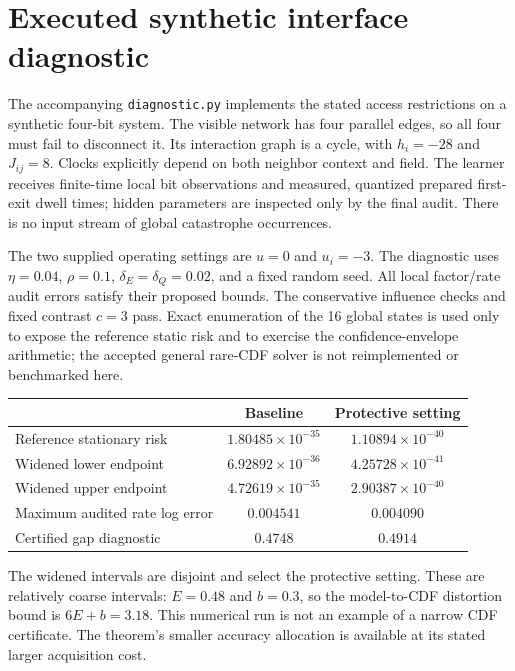 \documentclass[11pt]{article}
\begin{document}
\section{Executed synthetic interface diagnostic}
\label{sec:diagnostic}
The accompanying \texttt{diagnostic.py} implements the stated access restrictions on a synthetic four-bit system. The visible network has four parallel edges, so all four must fail to disconnect it. Its interaction graph is a cycle, with $h_i=-28$ and $J_{ij}=8$. Clocks explicitly depend on both neighbor context and field. The learner receives finite-time local bit observations and measured, quantized prepared first-exit dwell times; hidden parameters are inspected only by the final audit. There is no input stream of global catastrophe occurrences.

The two supplied operating settings are $u=0$ and $u_i=-3$. The diagnostic uses $\eta=0.04$, $\rho=0.1$, $\delta_E=\delta_Q=0.02$, and a fixed random seed. All local factor/rate audit errors satisfy their proposed bounds. The conservative influence checks and fixed contrast $c=3$ pass. Exact enumeration of the 16 global states is used only to expose the reference static risk and to exercise the confidence-envelope arithmetic; the accepted general rare-CDF solver is not reimplemented or benchmarked here.

\begin{center}
\begin{tabular}{lcc}
\toprule
 & Baseline & Protective setting\\
\midrule
Reference stationary risk & $1.80485\times10^{-35}$ & $1.10894\times10^{-40}$\\
Widened lower endpoint & $6.92892\times10^{-36}$ & $4.25728\times10^{-41}$\\
Widened upper endpoint & $4.72619\times10^{-35}$ & $2.90387\times10^{-40}$\\
Maximum audited rate log error & $0.004541$ & $0.004090$\\
Certified gap diagnostic & $0.4748$ & $0.4914$\\
\bottomrule
\end{tabular}
\end{center}
The widened intervals are disjoint and select the protective setting. These are relatively coarse intervals: $E=0.48$ and $b=0.3$, so the model-to-CDF distortion bound is $6E+b=3.18$. This numerical run is not an example of a narrow CDF certificate. The theorem's smaller accuracy allocation is available at its stated larger acquisition cost.
\end{document}
